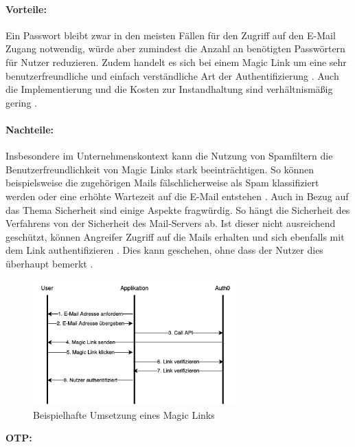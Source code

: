\paragraph*{Vorteile:} Ein Passwort bleibt zwar in den meisten Fällen für den Zugriff auf den E-Mail Zugang notwendig, würde aber zumindest die Anzahl an benötigten Passwörtern für Nutzer reduzieren. Zudem handelt es sich bei einem Magic Link um eine sehr benutzerfreundliche und einfach verständliche Art der Authentifizierung \cite{parmar2022comprehensive}. Auch die Implementierung und die Kosten zur Instandhaltung sind verhältnismäßig gering \cite{parmar2022comprehensive}.

\paragraph*{Nachteile:} Insbesondere im Unternehmenskontext kann die Nutzung von Spamfiltern die Benutzerfreundlichkeit von Magic Links stark beeinträchtigen. So können beispielsweise die zugehörigen Mails fälschlicherweise als Spam klassifiziert werden oder eine erhöhte Wartezeit auf die E-Mail entstehen \cite{parmar2022comprehensive}. Auch in Bezug auf das Thema Sicherheit sind einige Aspekte fragwürdig. So hängt die Sicherheit des Verfahrens von der Sicherheit des Mail-Servers ab. Ist dieser nicht ausreichend geschützt, können Angreifer Zugriff auf die Mails erhalten und sich ebenfalls mit dem Link authentifizieren \cite{chowhan2019password}. Dies kann geschehen, ohne dass der Nutzer dies überhaupt bemerkt \cite{chowhan2019password}.

\begin{figure}[h]
	\centering 
	\includegraphics[width=0.7\textwidth]{img/abbildungen/magic_link.png}
	\captionsetup{format=hang}
	\caption{Beispielhafte Umsetzung eines Magic Links} \label{magiclink}
\end{figure}

\textbf{\ac{OTP}:}

